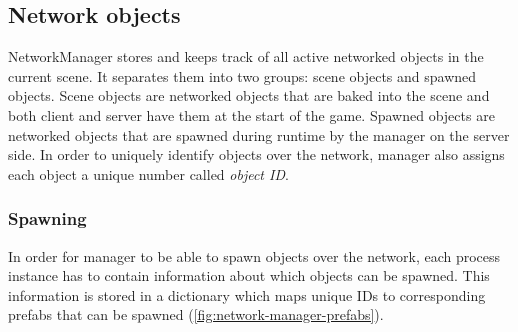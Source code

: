 \documentclass[times, utf8, diplomski]{fer}
\begin{document}
\subsection{Network objects}
NetworkManager stores and keeps track of all active networked objects in the current scene. It separates them into two groups: scene objects and spawned objects. Scene objects are networked objects that are baked into the scene and both client and server have them at the start of the game. Spawned objects are networked objects that are spawned during runtime by the manager on the server side. In order to uniquely identify objects over the network, manager also assigns each object a unique number called \textit{object ID}. \\

\subsubsection{Spawning}
In order for manager to be able to spawn objects over the network, each process instance has to contain information about which objects can be spawned. This information is stored in a dictionary which maps unique IDs to corresponding prefabs that can be spawned (\ref{fig:network-manager-prefabs}).
\end{document}
